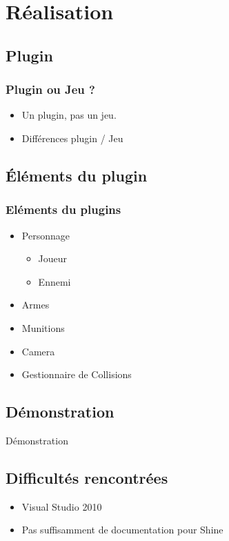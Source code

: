 \documentclass[handout]{beamer}
\begin{document}
\section{Réalisation}
\subsection{Plugin}
\begin{frame}
\frametitle{Plugin ou Jeu ?}
\begin{itemize}
\item
Un plugin, pas un jeu.
\item
Différences plugin / Jeu
\end{itemize}
\end{frame}

\subsection{Éléments du plugin}
\begin{frame}
\frametitle{Eléments du plugins}
\begin{itemize}
\item
Personnage
\begin{itemize}
\item
Joueur
\item
Ennemi
\end{itemize}
\item
Armes
\item
Munitions
\item
Camera
\item
Gestionnaire de Collisions

\end{itemize}

\end{frame}

\subsection{Démonstration}
\begin{frame}[plain,c]
\begin{center}
\Huge Démonstration
\end{center}


\end{frame}

\subsection{Difficultés rencontrées}
\begin{frame}
\begin{itemize}
\item
Visual Studio 2010
\item
Pas suffisamment de documentation pour Shine
\end{itemize}
\end{frame}
\end{document}
